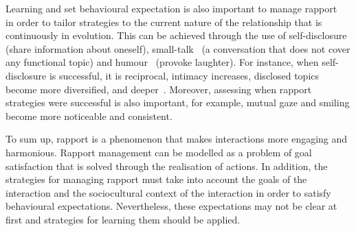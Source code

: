 Learning and set behavioural expectation is also important to manage rapport~\cite{Nomura2015} in order to tailor strategies to the current nature of the relationship that is continuously in evolution. This can be achieved through the use of self-disclosure \cite{Moon2000} (share information about oneself), small-talk~\cite{Cassell2003} (a conversation that does not cover any functional topic) and humour~\cite{Treger2013} (provoke laughter). For instance, when self-disclosure is successful, it is reciprocal, intimacy increases, disclosed topics become more diversified, and deeper~\cite{Zhao2014}. Moreover, assessing when rapport strategies were successful is also important, for example, mutual gaze and smiling become more noticeable and consistent\cite{Grahe1999, Zhao2014}.

To sum up, rapport is a phenomenon that makes interactions more engaging and harmonious. Rapport management can be modelled as a problem of goal satisfaction that is solved through the realisation of actions. In addition, the strategies for managing rapport must take into account the goals of the interaction and the sociocultural context of the interaction in order to satisfy behavioural expectations. Nevertheless, these expectations may not be clear at first and strategies for learning them should be applied.


